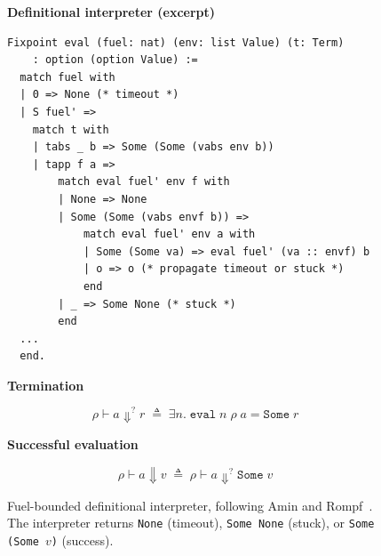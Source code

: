 \begin{figure}[t]
\small
\noindent\textbf{Definitional interpreter (excerpt)} \hfill {}

\vspace{0.5em}
\begin{center}
\begin{minipage}{0.85\columnwidth}
\begin{lstlisting}[morekeywords={Fixpoint,match,with,end,Some,None,option,nat,list},deletekeywords={val},morecomment={[s]{(*}{*)}},commentstyle=\color{gray}\itshape,basicstyle=\ttfamily\codesize]
Fixpoint eval (fuel: nat) (env: list Value) (t: Term)
    : option (option Value) :=
  match fuel with
  | 0 => None (* timeout *)
  | S fuel' =>
    match t with
    | tabs _ b => Some (Some (vabs env b))
    | tapp f a =>
        match eval fuel' env f with
        | None => None
        | Some (Some (vabs envf b)) =>
            match eval fuel' env a with
            | Some (Some va) => eval fuel' (va :: envf) b
            | o => o (* propagate timeout or stuck *)
            end
        | _ => Some None (* stuck *)
        end
  ...
  end.
\end{lstlisting}
\end{minipage}
\end{center}

\vspace{0.5em}
\noindent\textbf{Termination} \hfill {}

\vspace{0.3em}
\[\rho \vdash a \Downarrow^? r \;\triangleq\; \exists n.\; \texttt{eval}\; n\; \rho\; a = \texttt{Some}\; r\]

\vspace{0.5em}
\noindent\textbf{Successful evaluation} \hfill {}

\vspace{0.3em}
\[\rho \vdash a \Downarrow v \;\triangleq\; \rho \vdash a \Downarrow^? \texttt{Some}\; v\]

\vspace{0.5em}
\caption{Fuel-bounded definitional interpreter, following Amin and Rompf~\cite{amin2017}. The interpreter returns \texttt{None} (timeout), \texttt{Some None} (stuck), or \texttt{Some (Some $v$)} (success).}\label{fig:eval-interp}
\end{figure}
